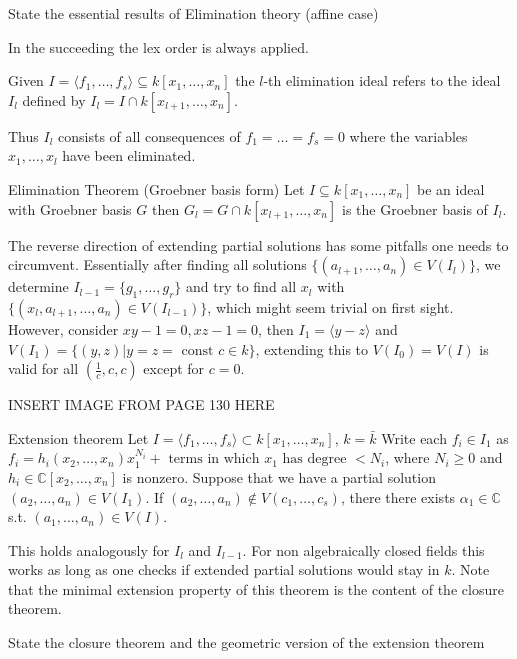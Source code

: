 State the essential results of Elimination theory (affine case)


In the succeeding the lex order is always applied.

Given \( I = \langle f_1, \dots, f_s \rangle \subseteq k[x_1, \dots, x_n] \) the \( l \)-th elimination ideal
refers to the ideal \( I_l \) defined by \( I_l = I \cap k[x_{l+1}, \dots, x_n] \).

Thus \( I_l \) consists of all consequences of \( f_1 = \dots = f_s = 0 \) where the variables \( x_1, \dots, x_l \) have been eliminated.


Elimination Theorem (Groebner basis form)
Let \( I  \subseteq k[x_1, \dots, x_n] \) be an ideal with Groebner basis \( G \)
then \( G_l = G \cap k[x_{l+1}, \dots, x_n] \) is the Groebner basis of \( I_l \).

The reverse direction of extending partial solutions has some pitfalls one needs to circumvent.
Essentially after finding all solutions \( \{(a_{l+1}, \dots, a_n) \in V(I_l) \} \), we determine \( I_{l-1} = \{g_1, \dots, g_r\} \) and try to find
all \( x_l \) with \( \{(x_l, a_{l+1}, \dots, a_n) \in V(I_{l-1}) \} \), which might seem trivial on first sight. 
However, consider \( xy - 1 = 0, xz -1 = 0 \), then \( I_1 = \langle y - z \rangle \) and \( V(I_1) = \{ (y, z) | y = z = \text{ const } c \in k\} \), 
extending this to \( V(I_0) = V(I) \) is valid for all \( (\frac{1}{c}, c, c) \) except for \( c = 0 \).

INSERT IMAGE FROM PAGE 130 HERE


Extension theorem
Let \( I = \langle f_1, \dots, f_s \rangle \subset k[x_1, \dots, x_n] \), \( k = \bar{k} \)
Write each \( f_i \in I_1 \) as \( f_i = h_i(x_2, \dots, x_n) x_1^{N_i} + \text{ terms in which } x_1 \text{ has degree } < N_i \),
where \( N_i \geq 0 \) and \( h_i \in \mathbb{C}[x_2, \dots, x_n] \) is nonzero. Suppose that we have
a partial solution \( (a_2, \dots, a_n) \in V(I_1) \). If \( (a_2, \dots, a_n) \nin V(c_1, \dots, c_s) \),
there there exists \( \alpha_1 \in \mathbb{C} \) s.t. \( (a_1, \dots, a_n) \in V(I) \).


This holds analogously for \( I_l \) and \( I_{l-1} \).
For non algebraically closed fields this works as long as one checks if extended partial solutions would stay in \( k \).
Note that the minimal extension property of this theorem is the content of the closure theorem.


State the closure theorem and the geometric version of the extension theorem

